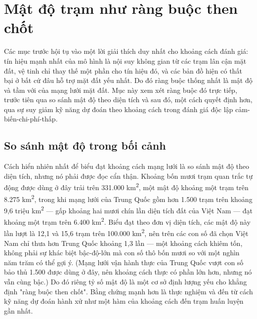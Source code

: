 \section{Mật độ trạm như ràng buộc then chốt}
Các mục trước hội tụ vào một lời giải thích duy nhất cho khoảng cách đánh giá: tín hiệu mạnh nhất của mô hình là nội suy không gian từ các trạm lân cận mặt đất, vệ tinh chỉ thay thế một phần cho tín hiệu đó, và các bản đồ hiện có thất bại ở bất cứ đâu hỗ trợ mặt đất yếu nhất. Do đó ràng buộc thống nhất là mật độ và tầm với của mạng lưới mặt đất. Mục này xem xét ràng buộc đó trực tiếp, trước tiên qua so sánh mật độ theo diện tích và sau đó, một cách quyết định hơn, qua sự suy giảm kỹ năng dự đoán theo khoảng cách trong đánh giá độc lập cảm-biến-chi-phí-thấp.
\subsection{So sánh mật độ trong bối cảnh}
Cách hiển nhiên nhất để biểu đạt khoảng cách mạng lưới là so sánh mật độ theo diện tích, nhưng nó phải được đọc cẩn thận. Khoảng bốn mươi trạm quan trắc tự động được dùng ở đây trải trên 331.000 km\textsuperscript{2}, một mật độ khoảng một trạm trên 8.275 km\textsuperscript{2}, trong khi mạng lưới của Trung Quốc gồm hơn 1.500 trạm trên khoảng 9,6 triệu km\textsuperscript{2} --- gấp khoảng hai mươi chín lần diện tích đất của Việt Nam --- đạt khoảng một trạm trên 6.400 km\textsuperscript{2}. Biểu đạt theo đơn vị diện tích, các mật độ này lần lượt là 12,1 và 15,6 trạm trên 100.000 km\textsuperscript{2}, nên trên các con số đã chọn Việt Nam chỉ thưa hơn Trung Quốc khoảng 1,3 lần --- một khoảng cách khiêm tốn, không phải sự khác biệt bậc-độ-lớn mà con số thô bốn mươi so với một nghìn năm trăm có thể gợi ý. (Mạng lưới vận hành thực của Trung Quốc vượt con số bảo thủ 1.500 được dùng ở đây, nên khoảng cách thực có phần lớn hơn, nhưng nó vẫn cùng bậc.) Do đó riêng tỷ số mật độ là một cơ sở định lượng yếu cho khẳng định "ràng buộc then chốt". Bằng chứng mạnh hơn là thực nghiệm và đến từ cách kỹ năng dự đoán hành xử như một hàm của khoảng cách đến trạm huấn luyện gần nhất.
